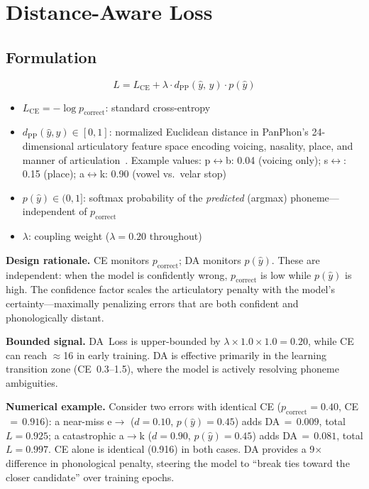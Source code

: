 \documentclass[conference]{IEEEtran}
\newcommand{\dpp}{d_{\mathrm{PP}}}        %
\newcommand{\LCE}{L_{\mathrm{CE}}}        %
\newcommand{\lam}{\lambda}                %
\begin{document}
\section{Distance-Aware Loss}
\label{sec:daloss}

\subsection{Formulation}

\begin{equation}
  \boxed{L = \LCE + \lam \cdot \dpp(\hat{y},\, y) \cdot p(\hat{y})}
  \label{eq:daloss}
\end{equation}

\begin{itemize}
  \item $\LCE = -\log p_\mathrm{correct}$: standard cross-entropy
  \item $\dpp(\hat{y}, y) \in [0,1]$: normalized Euclidean distance
        in PanPhon's 24-dimensional articulatory feature space
        encoding voicing, nasality, place, and manner of
        articulation~\cite{mortensen2016panphon}.
        Example values: p$\leftrightarrow$b: 0.04 (voicing only);
        s$\leftrightarrow$: 0.15 (place);
        a$\leftrightarrow$k: 0.90 (vowel vs.\ velar stop)
  \item $p(\hat{y}) \in (0,1]$: softmax probability of the
        \emph{predicted} (argmax) phoneme---independent of
        $p_\mathrm{correct}$
  \item $\lam$: coupling weight ($\lam\!=\!0.20$ throughout)
\end{itemize}

\textbf{Design rationale.}
CE monitors $p_\mathrm{correct}$; DA monitors $p(\hat{y})$.
These are independent: when the model is confidently wrong,
$p_\mathrm{correct}$ is low while $p(\hat{y})$ is high.
The confidence factor scales the articulatory penalty with the
model's certainty---maximally penalizing errors that are both
confident and phonologically distant.

\textbf{Bounded signal.}
DA~Loss is upper-bounded by $\lam\!\times\!1.0\!\times\!1.0=0.20$,
while CE can reach $\approx$16 in early training.
DA is effective primarily in the learning transition zone
(CE~0.3--1.5), where the model is actively resolving phoneme
ambiguities.

\textbf{Numerical example.}
Consider two errors with identical CE ($p_\mathrm{correct}\!=\!0.40$,
CE$\,=\,0.916$):
a near-miss e$\to$ ($d\!=\!0.10$, $p(\hat{y})\!=\!0.45$)
adds DA$\,=\,0.009$, total $L\!=\!0.925$;
a catastrophic a$\to$k ($d\!=\!0.90$, $p(\hat{y})\!=\!0.45$) adds
DA$\,=\,0.081$, total $L\!=\!0.997$.
CE alone is identical (0.916) in both cases.
DA provides a 9$\times$ difference in phonological penalty, steering
the model to ``break ties toward the closer candidate'' over training
epochs.
\end{document}
